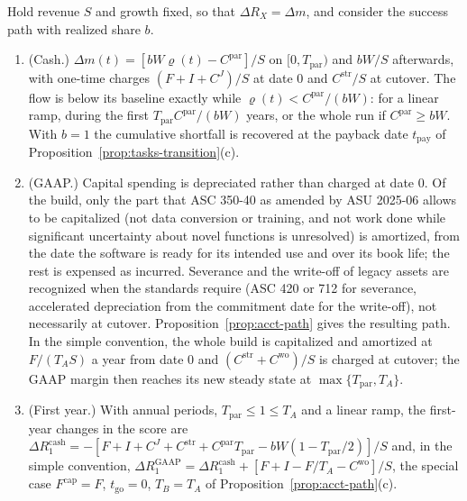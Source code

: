 \begin{proposition}\label{prop:tasks-scorepath}
Hold revenue $S$ and growth fixed, so that $\Delta R_X=\Delta m$, and consider the success path with realized share $b$.
\begin{enumerate}
\item[(a)] (Cash.) $\Delta m(t)=[bW\varrho(t)-C^{\mathrm{par}}]/S$ on $[0,T_{\mathrm{par}})$ and $bW/S$ afterwards, with one-time charges $(F+I+C^J)/S$ at date 0 and $C^{\mathrm{str}}/S$ at cutover. The flow is below its baseline exactly while $\varrho(t)<C^{\mathrm{par}}/(bW)$: for a linear ramp, during the first $T_{\mathrm{par}}C^{\mathrm{par}}/(bW)$ years, or the whole run if $C^{\mathrm{par}}\ge bW$. With $b=1$ the cumulative shortfall is recovered at the payback date $t_{\mathrm{pay}}$ of Proposition~\ref{prop:tasks-transition}(c).
\item[(b)] (GAAP.) Capital spending is depreciated rather than charged at date 0. Of the build, only the part that ASC 350-40 as amended by ASU 2025-06 allows to be capitalized (not data conversion or training, and not work done while significant uncertainty about novel functions is unresolved) is amortized, from the date the software is ready for its intended use and over its book life; the rest is expensed as incurred. Severance and the write-off of legacy assets are recognized when the standards require (ASC 420 or 712 for severance, accelerated depreciation from the commitment date for the write-off), not necessarily at cutover. Proposition~\ref{prop:acct-path} gives the resulting path. In the simple convention, the whole build is capitalized and amortized at $F/(T_AS)$ a year from date 0 and $(C^{\mathrm{str}}+C^{\mathrm{wo}})/S$ is charged at cutover; the GAAP margin then reaches its new steady state at $\max\{T_{\mathrm{par}},T_A\}$.
\item[(c)] (First year.) With annual periods, $T_{\mathrm{par}}\le 1\le T_A$ and a linear ramp, the first-year changes in the score are $\Delta R^{\mathrm{cash}}_1=-[F+I+C^J+C^{\mathrm{str}}+C^{\mathrm{par}}T_{\mathrm{par}}-bW(1-T_{\mathrm{par}}/2)]/S$ and, in the simple convention, $\Delta R^{\mathrm{GAAP}}_1=\Delta R^{\mathrm{cash}}_1+[F+I-F/T_A-C^{\mathrm{wo}}]/S$, the special case $F^{\mathrm{cap}}=F$, $t_{\mathrm{go}}=0$, $T_B=T_A$ of Proposition~\ref{prop:acct-path}(c).
\end{enumerate}
\end{proposition}

